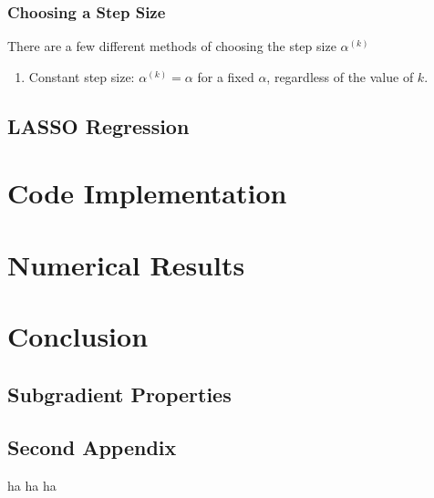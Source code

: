 \documentclass[conference]{IEEEtran}
\begin{document}
\subsubsection{Choosing a Step Size}
There are a few different methods of choosing the step size \(\alpha^{(k)}\)
\begin{enumerate}
    \item Constant step size: \(\alpha^{(k)} = \alpha\) for a fixed \(\alpha\), regardless of the value of \(k\).
\end{enumerate}

\subsection{LASSO Regression}\label{sec:math lasso}

\section{Code Implementation}\label{sec:code}

\section{Numerical Results}\label{sec:results}

\section{Conclusion}\label{sec:conclusion}

\appendix
\subsection{Subgradient Properties}\label{sec:subgradient properties proofs}
\subsubsection{}

\subsection{Second Appendix}
ha ha ha



\end{document}
